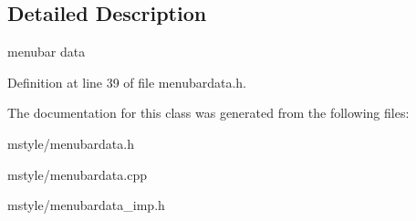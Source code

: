 \subsection{Detailed Description}
menubar data 

Definition at line 39 of file menubardata.\+h.



The documentation for this class was generated from the following files\+:\begin{DoxyCompactItemize}
\item 
mstyle/menubardata.\+h\item 
mstyle/menubardata.\+cpp\item 
mstyle/menubardata\+\_\+imp.\+h\end{DoxyCompactItemize}
